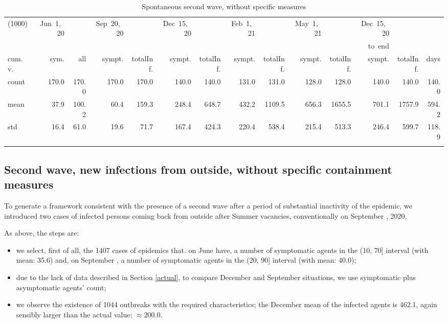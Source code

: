 \documentclass[graybox]{svmult}
\begin{document}
\begin{table}[t]
\center
\tiny
\begin{tabular}{lrrrrrrrrrrrrr}
\hline\noalign{\smallskip}
(1000) & Jun~1,~20 & & Sep~20,~20 & & Dec~15,~20 & & Feb~1,~21 & & May~1,~21 & & Dec~15,~20 \\
& & & & & & & & & & & to~end \\
cum.~v. & sym. & all & sympt. & totalInf. & sympt. & totalInf. & sympt. & totalInf. & sympt. & totalInf. & sympt. & totalInf. & days\\
\noalign{\smallskip}\svhline\noalign{\smallskip}
count & 170.0 & 170.0 & 170.0 & 170.0 & 140.0 & 140.0 & 131.0 & 131.0 & 128.0 & 128.0 & 140.0 & 140.0 & 140.0 \\
mean & 37.9 & 100.2 & 60.4 & 159.3 & 248.4 & 648.7 & 432.2 & 1109.5 & 656.3 & 1655.5 & 701.1 & 1757.9 & 594.2 \\
std & 16.4 & 61.0 & 19.6 & 71.7 & 167.4 & 424.3 & 220.4 & 538.4 & 215.4 & 513.3 & 246.4 & 599.7 & 118.9 \\
\hline\noalign{\smallskip}
\end{tabular}
\caption{Spontaneous second wave, without specific measures}
\label{selSpontWave2Tab}
\end{table}

\subsection{Second wave, new infections from outside, without specific containment measures}
\label{secondWithout}

To generate a framework consistent with the presence of a second wave after a period of substantial inactivity of the epidemic, we introduced two cases of infected persons coming back from outside after Summer vacancies, conventionally on September , 2020.

As above, the steps are:
\begin{itemize}

\item we select, first of all, the 1407 cases of epidemics that. on June  have, a number of symptomatic agents in the (10, 70] interval (with mean: 35.6) and, on September , a number of symptomatic agents in the (20, 90] interval (with mean: 40.0);

\item due to the lack of data described in Section \ref{actual}, to compare December  and September  situations, we use symptomatic plus asymptomatic agents' count;

\item we observe the existence of 1044 outbreaks with the required characteristics; the December mean of the infected agents is 462.1, again sensibly larger than the actual value: $\approx$200.0. 

\end{itemize}
\end{document}
